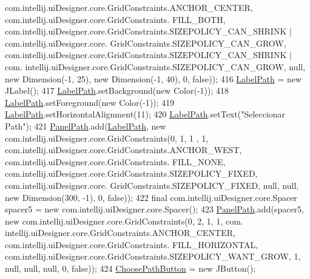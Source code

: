 \begin{DoxyCode}
      com.intellij.uiDesigner.core.GridConstraints.ANCHOR\_CENTER, com.intellij.uiDesigner.core.GridConstraints.
      FILL\_BOTH, com.intellij.uiDesigner.core.GridConstraints.SIZEPOLICY\_CAN\_SHRINK | com.intellij.uiDesigner.core.
      GridConstraints.SIZEPOLICY\_CAN\_GROW, com.intellij.uiDesigner.core.GridConstraints.SIZEPOLICY\_CAN\_SHRINK | com.
      intellij.uiDesigner.core.GridConstraints.SIZEPOLICY\_CAN\_GROW, null, \textcolor{keyword}{new} Dimension(-1, 25), \textcolor{keyword}{new} Dimension(-1, 
      40), 0, \textcolor{keyword}{false}));
416         \hyperlink{classpresentacion_1_1form_1_1mainForm_a54f7619a7cbb904b26c32ccaef512573}{LabelPath} = \textcolor{keyword}{new} JLabel();
417         \hyperlink{classpresentacion_1_1form_1_1mainForm_a54f7619a7cbb904b26c32ccaef512573}{LabelPath}.setBackground(\textcolor{keyword}{new} Color(-1));
418         \hyperlink{classpresentacion_1_1form_1_1mainForm_a54f7619a7cbb904b26c32ccaef512573}{LabelPath}.setForeground(\textcolor{keyword}{new} Color(-1));
419         \hyperlink{classpresentacion_1_1form_1_1mainForm_a54f7619a7cbb904b26c32ccaef512573}{LabelPath}.setHorizontalAlignment(11);
420         \hyperlink{classpresentacion_1_1form_1_1mainForm_a54f7619a7cbb904b26c32ccaef512573}{LabelPath}.setText(\textcolor{stringliteral}{"Seleccionar Path"});
421         \hyperlink{classpresentacion_1_1form_1_1mainForm_a0704eebe3c2e55cfd3b9344cca4d2d4b}{PanelPath}.add(\hyperlink{classpresentacion_1_1form_1_1mainForm_a54f7619a7cbb904b26c32ccaef512573}{LabelPath}, \textcolor{keyword}{new} com.intellij.uiDesigner.core.GridConstraints(0, 1, 1
      , 1, com.intellij.uiDesigner.core.GridConstraints.ANCHOR\_WEST, com.intellij.uiDesigner.core.GridConstraints.
      FILL\_NONE, com.intellij.uiDesigner.core.GridConstraints.SIZEPOLICY\_FIXED, com.intellij.uiDesigner.core.
      GridConstraints.SIZEPOLICY\_FIXED, null, null, \textcolor{keyword}{new} Dimension(300, -1), 0, \textcolor{keyword}{false}));
422         \textcolor{keyword}{final} com.intellij.uiDesigner.core.Spacer spacer5 = \textcolor{keyword}{new} com.intellij.uiDesigner.core.Spacer();
423         \hyperlink{classpresentacion_1_1form_1_1mainForm_a0704eebe3c2e55cfd3b9344cca4d2d4b}{PanelPath}.add(spacer5, \textcolor{keyword}{new} com.intellij.uiDesigner.core.GridConstraints(0, 2, 1, 1, com.
      intellij.uiDesigner.core.GridConstraints.ANCHOR\_CENTER, com.intellij.uiDesigner.core.GridConstraints.
      FILL\_HORIZONTAL, com.intellij.uiDesigner.core.GridConstraints.SIZEPOLICY\_WANT\_GROW, 1, null, null, null, 0, \textcolor{keyword}{false}));
424         \hyperlink{classpresentacion_1_1form_1_1mainForm_a0f7073c8a28d814154d208bc924fedb4}{ChoosePathButton} = \textcolor{keyword}{new} JButton();

\end{DoxyCode}
